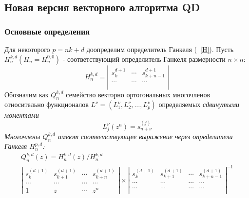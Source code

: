 \subsection{Новая версия векторного алгоритма QD}
\subsubsection{Основные определения}
Для некоторого $p=nk+d$ доопределим  определитель Ганкеля
(~\ref{H}). Пусть $H_n^{k,d} (H_n=H_n^{0,0}) $ - соответствующий
определитель Ганкеля размерности $n \times n$:
$$%
H_n^{k,d}= \left|
\begin{array}{cccccccccccccccccccccc}
s_k^{d+1} & \cdots & s_{k+n-1}^{d+1} \\
\cdots & \cdots & \cdots \\
\end{array}
\right|
$$%
Обозначим как $Q_n^{k,d}$ семейство векторно ортогональных
многочленов относительно функционалов
$L^{\nu}=(L_1^{\nu},L_2^{\nu},\ldots,L_p^{\nu})$ определяемых \it
сдвинутыми \rm моментами
$$ L_j^{\nu}(z^n)=s_{n+\nu}^{(j)}$$
Многочлены $Q_n^{k,d}$ имеют соответствующее выражение через
определители Ганкеля $H_n^{p,d}$:
\begin{equation}
\label{Q_from_H}
\begin{array}{cc}
Q_n^{k,d}(z)=H_n^{k,d}(z)/H_n^{k,d}\\
\left|\begin{array}{ccccc}
s_{k}^{(d+1)} & s_{k+1}^{(d+1)} & \cdots & s_{k+n}^{(d+1)}\\
\cdots & \cdots & \cdots & \cdots\\
1               & z               & \cdots & z^n
\end{array}\right|
\times {\left|\begin{array}{cccc}
s_{k}^{(d+1)} & s_{k+1}^{(d+1)} & \cdots & s_{k+n-1}^{(d+1)}\\
\cdots & \cdots & \cdots & \cdots\\
\cdots & \cdots & \cdots & \cdots\\
\end{array}\right|}^{-1}
\end{array}
\end{equation}
